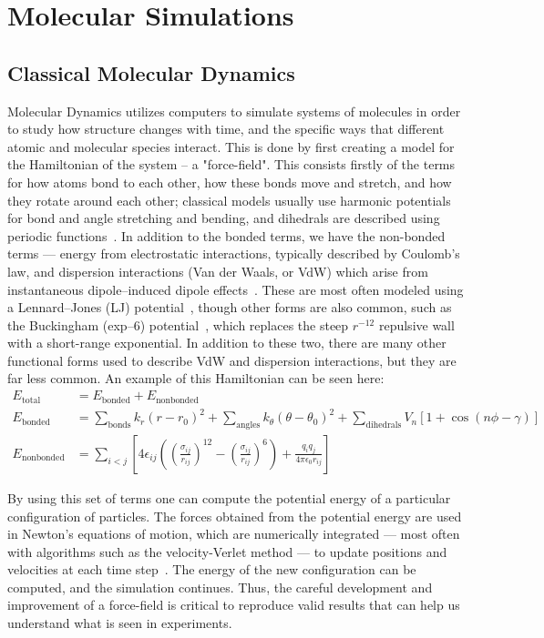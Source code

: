 \section{Molecular Simulations}
\subsection{Classical Molecular Dynamics}
Molecular Dynamics utilizes computers to simulate systems of molecules in order to study how structure changes
with time, and the specific ways that different atomic and molecular species interact. This is done
by first creating a model for the Hamiltonian of the system -- a "force-field". This consists firstly of the terms for how atoms
bond to each other, how these bonds move and stretch, and how they rotate around each other; classical models
usually use harmonic potentials for bond and angle stretching and bending, and dihedrals 
are described using periodic functions~\cite{gromacsmanual}.
In addition to the bonded terms, we have the non-bonded terms — energy from 
electrostatic interactions, typically described by Coulomb's law, and dispersion 
interactions (Van der Waals, or VdW) which arise from instantaneous dipole–induced dipole effects~\cite{gromacsmanual}. These are 
most often modeled using a Lennard–Jones (LJ) potential~\cite{Jones:1924,gromacsmanual}, though other forms are 
also common, such as the Buckingham (exp–6) potential~\cite{Buckingham:1938,gromacsmanual}, which replaces the steep 
\(r^{-12}\) repulsive wall with a short-range exponential. In addition to these two, there are many other
functional forms used to describe VdW and dispersion interactions, but they are far less common. An example of this Hamiltonian
can be seen here:
\begin{align}
E_{\mathrm{total}} &= E_{\mathrm{bonded}} + E_{\mathrm{nonbonded}} \\
E_{\mathrm{bonded}} &= \sum_{\text{bonds}} k_r (r - r_0)^2
+ \sum_{\text{angles}} k_\theta (\theta - \theta_0)^2
+ \sum_{\text{dihedrals}} V_n \left[ 1 + \cos\left( n\phi - \gamma \right) \right] \\
E_{\mathrm{nonbonded}} &= \sum_{i<j} \left[ 4\epsilon_{ij} \left( \left( \frac{\sigma_{ij}}{r_{ij}} \right)^{12}
- \left( \frac{\sigma_{ij}}{r_{ij}} \right)^{6} \right)
+ \frac{q_i q_j}{4\pi\epsilon_0 r_{ij}} \right]
\end{align}

By using this set of terms one can compute the potential energy of a particular configuration of particles. 
The forces obtained from the potential energy are used in Newton’s equations of motion, 
which are numerically integrated — most often with algorithms such as the velocity-Verlet method — 
to update positions and velocities at each time step~\cite{gromacsmanual}.
The energy of the new configuration
can be computed, and the simulation continues. Thus, the careful development and improvement of a force-field is critical to 
reproduce valid results that can help us understand what is seen in experiments.
